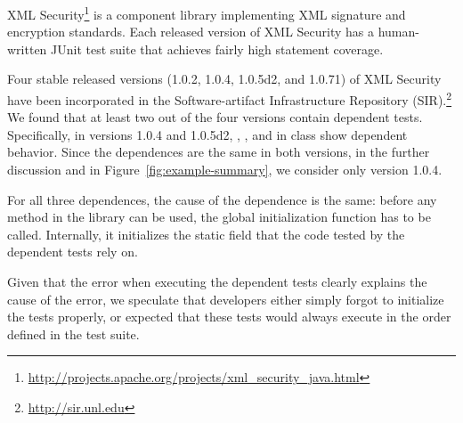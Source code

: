 
XML Security\footnote{\url{http://projects.apache.org/projects/xml_security_java.html}}
is a component library implementing XML signature and encryption
standards. Each released
version of XML Security has a human-written JUnit test suite that
achieves fairly high statement coverage.

Four stable released versions (1.0.2, 1.0.4, 1.0.5d2, and 1.0.71) of XML Security
have been incorporated in the Soft\-ware-artifact Infrastructure Repository
(SIR).\footnote{\url{http://sir.unl.edu}}
We found that at least two out of the four versions contain dependent tests. Specifically, in versions 1.0.4 and 1.0.5d2, , , and 
in class  show dependent behavior.
Since the dependences are the same in both versions, in the further
discussion and in Figure~\ref{fig:example-summary}, we consider only
version 1.0.4.

For all three dependences, the cause of the dependence is the same: before any
method in the library can be used, the global initialization function 
 has to be called. Internally, it initializes
the static field that the code tested by the dependent tests rely
on.

Given that the error when executing the dependent tests clearly explains the
cause of the error, we speculate that developers either simply forgot to
initialize the tests properly, or expected that these tests would always execute
in the order defined
in the test suite.

%
%


